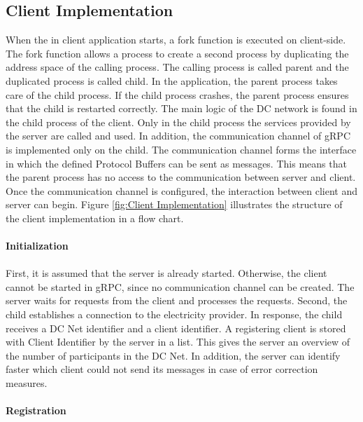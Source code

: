 \subsection{Client Implementation}
When the in client application starts, a fork function is executed on client-side. The fork function allows a process to create a second process by duplicating the address space of the calling process. The calling process is called parent and the duplicated process is called child. In the application, the parent process takes care of the child process. If the child process crashes, the parent process ensures that the child is restarted correctly. The main logic of the DC network is found in the child process of the client. Only in the child process the services provided by the server are called and used. In addition, the communication channel of gRPC is implemented only on the child. The communication channel forms the interface in which the defined Protocol Buffers can be sent as messages. This means that the parent process has no access to the communication between server and client. Once the communication channel is configured, the interaction between client and server can begin. Figure \ref{fig:Client Implementation} illustrates the structure of the client implementation in a flow chart.
\\
\\
\textbf{Initialization}
\\
\\
First, it is assumed that the server is already started. Otherwise, the client cannot be started in gRPC, since no communication channel can be created. The server waits for requests from the client and processes the requests. Second, the child establishes a connection to the electricity provider. In response, the child receives a DC Net identifier and a client identifier. A registering client is stored with Client Identifier by the server in a list. This gives the server an overview of the number of participants in the DC Net. In addition, the server can identify faster which client could not send its messages in case of error correction measures. \\
\\
\textbf{Registration}
\\
\\
